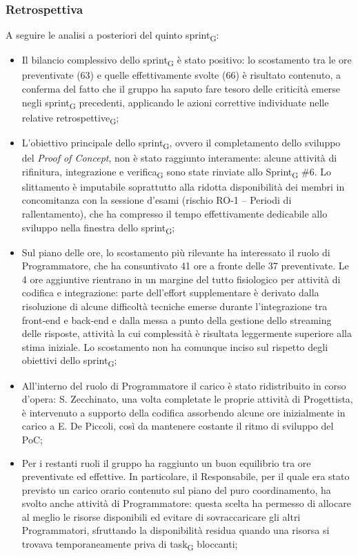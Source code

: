 \documentclass[a4paper, 10pt, colorlinks=true, linkcolor=black, urlcolor=blue, citecolor=blue, hidelinks]{article}
\begin{document}
\subsubsection{Retrospettiva}
A seguire le analisi a posteriori del quinto sprint\textsubscript{G}:
\begin{itemize}
    \item Il bilancio complessivo dello sprint\textsubscript{G} è stato positivo: lo scostamento tra le ore preventivate (63) e quelle effettivamente svolte (66) è risultato contenuto, a conferma del fatto che il gruppo ha saputo fare tesoro delle criticità emerse negli sprint\textsubscript{G} precedenti, applicando le azioni correttive individuate nelle relative retrospettive\textsubscript{G};
    \item L'obiettivo principale dello sprint\textsubscript{G}, ovvero il completamento dello sviluppo del \textit{Proof of Concept}, non è stato raggiunto interamente: alcune attività di rifinitura, integrazione e verifica\textsubscript{G} sono state rinviate allo Sprint\textsubscript{G} \#6. Lo slittamento è imputabile soprattutto alla ridotta disponibilità dei membri in concomitanza con la sessione d'esami (rischio RO-1 -- Periodi di rallentamento), che ha compresso il tempo effettivamente dedicabile allo sviluppo nella finestra dello sprint\textsubscript{G};
    \item Sul piano delle ore, lo scostamento più rilevante ha interessato il ruolo di Programmatore, che ha consuntivato 41 ore a fronte delle 37 preventivate. Le 4 ore aggiuntive rientrano in un margine del tutto fisiologico per attività di codifica e integrazione: parte dell'effort supplementare è derivato dalla risoluzione di alcune difficoltà tecniche emerse durante l'integrazione tra front-end e back-end e dalla messa a punto della gestione dello streaming delle risposte, attività la cui complessità è risultata leggermente superiore alla stima iniziale. Lo scostamento non ha comunque inciso sul rispetto degli obiettivi dello sprint\textsubscript{G};
    \item All'interno del ruolo di Programmatore il carico è stato ridistribuito in corso d'opera: S. Zecchinato, una volta completate le proprie attività di Progettista, è intervenuto a supporto della codifica assorbendo alcune ore inizialmente in carico a E. De Piccoli, così da mantenere costante il ritmo di sviluppo del PoC;
    \item Per i restanti ruoli il gruppo ha raggiunto un buon equilibrio tra ore preventivate ed effettive. In particolare, il Responsabile, per il quale era stato previsto un carico orario contenuto sul piano del puro coordinamento, ha svolto anche attività di Programmatore: questa scelta ha permesso di allocare al meglio le risorse disponibili ed evitare di sovraccaricare gli altri Programmatori, sfruttando la disponibilità residua quando una risorsa si trovava temporaneamente priva di task\textsubscript{G} bloccanti;

\end{itemize}
\end{document}
